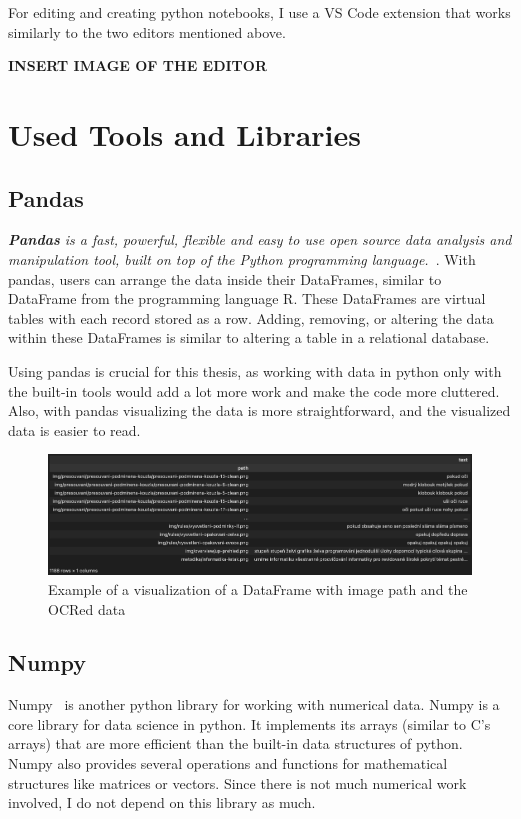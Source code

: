 \documentclass[
  digital,     %
  oneside,     %
  nosansbold,  %
  nocolorbold, %
  nolof,         %
  nolot,         %
]{fithesis4}
\begin{document}
For editing and creating python notebooks, I use a VS Code extension that works similarly to the two editors mentioned above.

\textbf{INSERT IMAGE OF THE EDITOR}

\section{Used Tools and Libraries}

\subsection{Pandas}

\emph{\textbf{Pandas} is a fast, powerful, flexible and easy to use open source data analysis and manipulation tool, built on top of the Python programming language.}~\cite{pandas}. With pandas, users can arrange the data inside their DataFrames, similar to DataFrame from the programming language R. These DataFrames are virtual tables with each record stored as a row. Adding, removing, or altering the data within these DataFrames is similar to altering a table in a relational database.

Using pandas is crucial for this thesis, as working with data in python only with the built-in tools would add a lot more work and make the code more cluttered. Also, with pandas visualizing the data is more straightforward, and the visualized data is easier to read.

\begin{figure}[h]
\caption{Example of a visualization of a DataFrame with image path and the OCRed data}
\includegraphics[width=\textwidth]{images/dataframe-visualization.png}
\centering
\end{figure}

\subsection{Numpy}

Numpy~\cite{numpy} is another python library for working with numerical data. Numpy is a core library for data science in python. It implements its arrays (similar to C's arrays) that are more efficient than the built-in data structures of python. Numpy also provides several operations and functions for mathematical structures like matrices or vectors. Since there is not much numerical work involved, I do not depend on this library as much.
\end{document}
